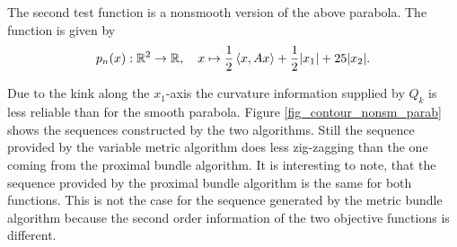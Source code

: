 The second test function is a nonsmooth version of the above parabola. The function is given by 
\[ p_n(x): \mathbb{R}^2 \to \mathbb{R}, \quad x \mapsto \frac{1}{2}\left\langle x, Ax \right\rangle + \frac{1}{2}|x_1|+25|x_2|. \]

Due to the kink along the \(x_1\)-axis the curvature information supplied by \(Q_k\) is less reliable than for the smooth parabola.
Figure \ref{fig_contour_nonsm_parab} shows the sequences constructed by the two algorithms. Still the sequence provided by the variable metric algorithm does less zig-zagging than the one coming from the proximal bundle algorithm.
It is interesting to note, that the sequence provided by the proximal bundle algorithm is the same for both functions. This is not the case for the sequence generated by the metric bundle algorithm because the second order information of the two objective functions is different.

